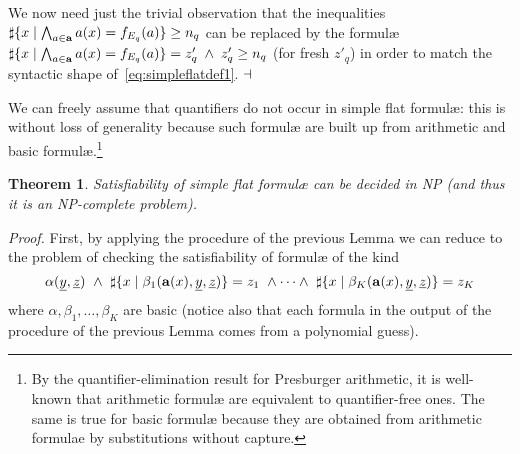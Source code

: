 \documentclass[11pt,a4paper]{article}
\newcommand{\formulae}{formul\ae\xspace}
\newcommand{\uy}{\ensuremath{\underline y}}
\newcommand{\uz}{\ensuremath{\underline z}}
\newcommand{\ta}{\ensuremath{{\bf a}}\xspace}
\newtheorem{theorem}{Theorem}
\begin{document}
We now need just the  trivial observation that the inequalities $\sharp\{x\mid \bigwedge_{a\in \ta} a(x)=f_{E_q}(a)\}\geq n_q $ can be 
replaced by the \formulae $\sharp\{x\mid \bigwedge_{a\in \ta} a(x)=f_{E_q}(a)\}= z'_q\;\wedge\;  z'_q\geq n_q $ (for fresh $z'_q$) in order
to match the syntactic shape of~\eqref{eq:simpleflatdef1}.
  $\hfill\dashv$

 

We can freely assume that quantifiers do not occur in simple flat  \formulae: this is without loss of generality because such \formulae are built up from 
arithmetic and basic \formulae.\footnote{ By the quantifier-elimination result for Presburger arithmetic, it is well-known that arithmetic \formulae 
are equivalent to quantifier-free ones. The same is true for basic \formulae  because they are obtained from arithmetic 
formulae by substitutions without capture. 
}

\begin{theorem}\label{thm:flatsimple}
 Satisfiability of simple flat  \formulae can be decided in NP (and thus it is an NP-complete problem).
\end{theorem}

\noindent
\textit{Proof.} 
 First, by applying the procedure of the 
 previous Lemma we can reduce to the problem of checking the satisfiability of \formulae of the kind
 \begin{equation}\label{eq:card00}
\alpha(\uy, \uz)~ \wedge~ \sharp\{x\mid \beta_1(\ta(x), \uy, \uz)\} =z_1~\wedge \cdots \wedge~ \sharp\{x\mid \beta_K(\ta(x),\uy, \uz )\} =z_K
\end{equation}
where $\alpha, \beta_1, \dots, \beta_K$ are basic
(notice also that each formula in the output of the procedure of the previous Lemma comes from a polynomial guess).
\end{document}
